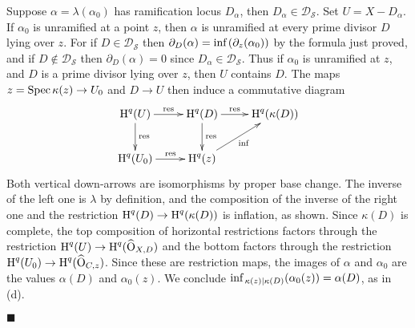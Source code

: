\documentclass{amsart}
\theoremstyle{plain}
\theoremstyle{definition}
\theoremstyle{remark}
\numberwithin{equation}{section}%
\renewcommand{\H}{{\text{\rm H}}}
\renewcommand{\O}{{\text{\rm O}}}
\renewcommand{\S}{{\mathcal S}}
\renewcommand{\inf}{{\text{\rm inf}\,}}
\newcommand{\res}{{\text{\rm res}}}
\newcommand{\Spec}{{\text{\rm Spec}\,}}
\begin{document}
Suppose $\alpha=\lambda(\alpha_0)$ has ramification locus $D_\alpha$,
then $D_\alpha\in\mathscr D_\S$.  Set $U=X-D_\alpha$.
If $\alpha_0$ is unramified at a point $z$, then $\alpha$ is unramified at 
every prime divisor $D$ lying over $z$.
For if $D\in\mathscr D_\S$ then $\partial_D(\alpha)=\inf(\partial_{z}(\alpha_0))$
by the formula just proved,
and if $D\not\in\mathscr D_\S$ then $\partial_D(\alpha)=0$ since $D_\alpha\in\mathscr D_\S$.
Thus if $\alpha_0$ is unramified at $z$, and $D$ is a prime divisor lying over $z$,
then $U$ contains $D$.
%
The maps $z=\Spec \kappa(z)\to U_0$ and $D\to U$ then induce a commutative diagram
\[\xymatrix{
\H^q(U)\ar[r]^-{\res}\ar[d]^{\res}&\H^q(D)\ar[r]^-{\res}\ar[d]^{\res}&\H^q(\kappa(D))\\
{\H^q(U_0)}{\ar[r]^-{\res}}&{\H^q(z)}\ar[ur]_{\inf}}
\]
Both vertical down-arrows are isomorphisms by proper base change. 
The inverse of the left one is $\lambda$ by definition,
and the composition of the inverse of the right one and the restriction
$\H^q(D)\to\H^q(\kappa(D))$ is inflation, as shown. 
Since $\kappa(D)$ is complete, the top composition of horizontal restrictions factors through the restriction
$\H^q(U)\to\H^q(\widehat\O_{X,D})$ and 
the bottom factors through the restriction
$\H^q(U_0)\to\H^q(\widehat\O_{C,z})$. 
Since these are restriction maps, the images of $\alpha$ and $\alpha_0$ are 
the values $\alpha(D)$ and $\alpha_0(z)$.
We conclude $\inf_{\kappa(z)|\kappa(D)}(\alpha_0(z))=\alpha(D)$, as in (d).

\hfill $\blacksquare$
\end{document}
